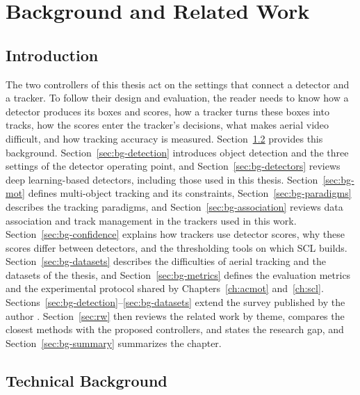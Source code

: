 \chapter{Background and Related Work}\label{ch:background}

\section{Introduction}\label{sec:bg-intro}
The two controllers of this thesis act on the settings that connect a detector and a tracker. To follow their design and evaluation, the reader needs to know how a detector produces its boxes and scores, how a tracker turns these boxes into tracks, how the scores enter the tracker's decisions, what makes aerial video difficult, and how tracking accuracy is measured. Section~\ref{sec:bg-technical} provides this background. Section~\ref{sec:bg-detection} introduces object detection and the three settings of the detector operating point, and Section~\ref{sec:bg-detectors} reviews deep learning-based detectors, including those used in this thesis. Section~\ref{sec:bg-mot} defines multi-object tracking and its constraints, Section~\ref{sec:bg-paradigms} describes the tracking paradigms, and Section~\ref{sec:bg-association} reviews data association and track management in the trackers used in this work. Section~\ref{sec:bg-confidence} explains how trackers use detector scores, why these scores differ between detectors, and the thresholding tools on which SCL builds. Section~\ref{sec:bg-datasets} describes the difficulties of aerial tracking and the datasets of the thesis, and Section~\ref{sec:bg-metrics} defines the evaluation metrics and the experimental protocol shared by Chapters~\ref{ch:acmot} and~\ref{ch:scl}. Sections~\ref{sec:bg-detection}--\ref{sec:bg-datasets} extend the survey published by the author \cite{ismail2026realtime}. Section~\ref{sec:rw} then reviews the related work by theme, compares the closest methods with the proposed controllers, and states the research gap, and Section~\ref{sec:bg-summary} summarizes the chapter.

\section{Technical Background}\label{sec:bg-technical}

